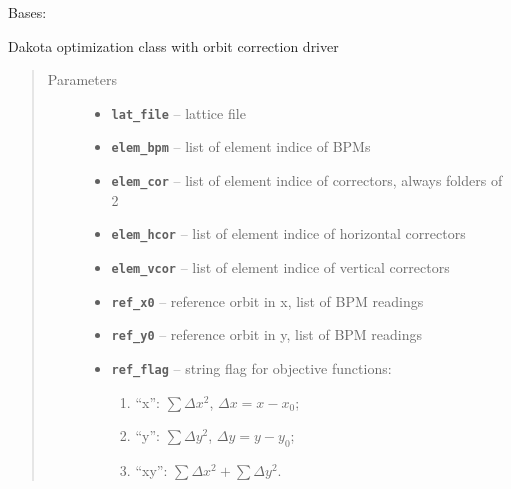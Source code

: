 \documentclass[letterpaper,10pt,english]{sphinxmanual}
\begin{document}

\begin{fulllineitems}
\label{src/apidocs/dakopt:genopt.dakopt.DakotaOC}
Bases: {\hyperref[src/apidocs/dakopt:genopt.dakopt.DakotaBase]{}}

Dakota optimization class with orbit correction driver
\begin{quote}\begin{description}
\item[{Parameters}] \leavevmode\begin{itemize}
\item {} 
\textbf{\texttt{lat\_file}} -- lattice file

\item {} 
\textbf{\texttt{elem\_bpm}} -- list of element indice of BPMs

\item {} 
\textbf{\texttt{elem\_cor}} -- list of element indice of correctors, always folders of 2

\item {} 
\textbf{\texttt{elem\_hcor}} -- list of element indice of horizontal correctors

\item {} 
\textbf{\texttt{elem\_vcor}} -- list of element indice of vertical correctors

\item {} 
\textbf{\texttt{ref\_x0}} -- reference orbit in x, list of BPM readings

\item {} 
\textbf{\texttt{ref\_y0}} -- reference orbit in y, list of BPM readings

\item {} 
\textbf{\texttt{ref\_flag}} -- 
string flag for objective functions:
\begin{enumerate}
\item {} 
``x'': \(\sum \Delta x^2\), \(\Delta x = x-x_0\);

\item {} 
``y'': \(\sum \Delta y^2\), \(\Delta y = y-y_0\);

\item {} 
``xy'': \(\sum \Delta x^2 + \sum \Delta y^2\).


\end{enumerate}
\end{itemize}
\end{description}
\end{quote}
\end{fulllineitems}
\end{document}
